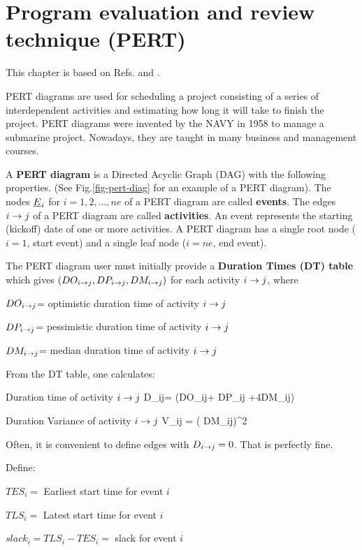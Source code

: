 \chapter{Program evaluation
 and review technique (PERT)}
This chapter is based on
Refs.\cite{ibook} and \cite{wiki-pert}.

PERT diagrams are 
used for scheduling a 
project consisting of a series
of interdependent activities
and estimating how
long it will take
to finish the project.
PERT diagrams were invented by the NAVY 
in 1958
to manage a submarine project.
Nowadays, they are taught in many business 
and management courses.

A {\bf PERT diagram}
is a  Directed Acyclic Graph (DAG)
with the following properties. 
(See Fig.\ref{fig-pert-diag}
for an example of a PERT diagram).
The nodes $\rvE_i$ for $i=1, 2, \ldots, ne$ of a
PERT diagram are called {\bf events}.
 The edges $i\rightarrow j$ of a PERT diagram are called
 {\bf activities}.
An event represents the starting 
(kickoff) date of one or more
activities.
A PERT diagram has a 
single root node ($i=1$, start event)
and a single leaf node ($i=ne$, end event).

The PERT diagram user 
must initially 
provide a
{\bf Duration Times (DT) table} which gives $(DO_{i\rightarrow j}, 
DP_{i\rightarrow j}, DM_{i\rightarrow j})$ for each activity
$i\rightarrow j$, where

$DO_{i\rightarrow j}$= optimistic duration time 
of activity $i\rightarrow j$

$DP_{i\rightarrow j}$= pessimistic duration time 
of activity $i\rightarrow j$

$DM_{i\rightarrow j}$= median duration time 
of activity $i\rightarrow j$

From the DT table, one calculates:

Duration time of activity $i\rightarrow j$ 
\beq
D_{i\rarrow j}= (DO_{i\rarrow j}+
DP_{i\rarrow j} +4DM_{i\rarrow j})
\eeq

Duration Variance of activity $i\rightarrow j$
\beq
V_{i\rarrow j} = \left(
{DM_{i\rarrow j}}\right)^2
\eeq

Often,
it is convenient to define
 edges with $D_{i\rightarrow j}=0$.
That is perfectly fine.

Define:

$TES_i=$ Earliest start time for event $i$

$TLS_i=$ Latest start time for event $i$

$slack_i=TLS_i-TES_i=$ slack for event $i$

